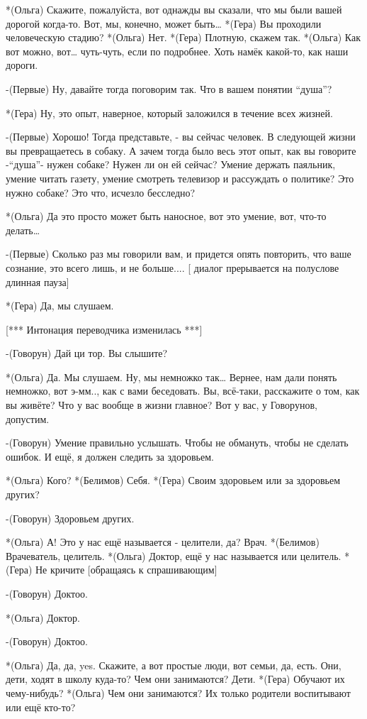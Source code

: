 *(Ольга) Скажите, пожалуйста, вот однажды вы сказали, что мы были вашей дорогой  когда-то. Вот, мы, конечно,  может быть…
*(Гера) Вы проходили человеческую стадию?
*(Ольга) Нет.
*(Гера) Плотную, скажем так.
*(Ольга) Как вот можно, вот… чуть-чуть, если по подробнее. Хоть намёк какой-то, как наши дороги.

-(Первые) Ну, давайте тогда поговорим так. Что в вашем понятии “душа”?

*(Гера) Ну, это опыт, наверное, который заложился  в течение всех жизней.

-(Первые) Хорошо! Тогда представьте, - вы сейчас человек. В следующей жизни вы превращаетесь в собаку. А зачем тогда было весь этот опыт, как вы говорите -“душа”- нужен собаке? Нужен ли он ей сейчас? Умение держать паяльник, умение читать газету, умение смотреть телевизор и рассуждать о политике? Это нужно собаке? Это что, исчезло бесследно? 

*(Ольга) Да это просто может быть наносное, вот это умение, вот, что-то делать…

-(Первые) Сколько раз мы говорили вам, и придется опять повторить, что ваше сознание, это всего лишь, и не больше....
[ диалог прерывается на полуслове длинная пауза]

*(Гера) Да, мы слушаем.

[*** Интонация переводчика изменилась ***]

-(Говорун) Дай ци тор. Вы слышите?

*(Ольга) Да. Мы слушаем. Ну, мы немножко так… Вернее, нам дали понять немножко, вот э-мм.., как с вами беседовать. Вы, всё-таки, расскажите о том, как вы живёте? Что у вас вообще в жизни главное? Вот у вас, у Говорунов, допустим. 

-(Говорун) Умение правильно услышать. Чтобы не обмануть, чтобы не сделать ошибок. И ещё, я должен следить за здоровьем.

*(Ольга) Кого?
*(Белимов) Себя.
*(Гера) Своим здоровьем или за здоровьем других?

-(Говорун) Здоровьем других.

*(Ольга) А! Это у нас ещё называется - целители, да? Врач.
*(Белимов) Врачеватель, целитель.
*(Ольга) Доктор, ещё у нас называется или целитель.
*(Гера) Не кричите [обращаясь к спрашивающим]

-(Говорун) Доктоо.

*(Ольга) Доктор.

-(Говорун) Доктоо.

*(Ольга) Да, да, yes. Скажите, а вот простые люди, вот семьи, да, есть. Они, дети, ходят в школу куда-то? Чем они занимаются? Дети.
*(Гера) Обучают их чему-нибудь?
*(Ольга) Чем они занимаются? Их только родители воспитывают или ещё кто-то?

